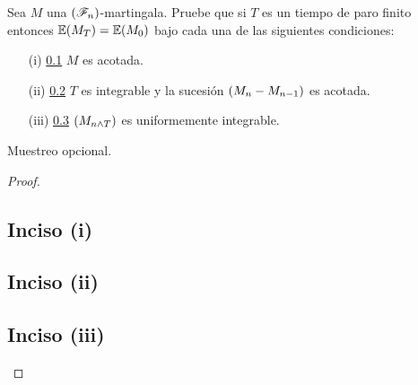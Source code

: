 \begin{problema}
Sea $M$ una $\left( \mathscr{F}_n\right) $-martingala. Pruebe que si $T$ es un tiempo de paro finito entonces $\mathbb{E}\! \left( M_T \right)=\mathbb{E}\! \left( M_0 \right)$ bajo cada una de las siguientes condiciones:
\begin{enumerate}
    \item[(i)] \ref{problema3_1:inciso1}
        $M$ es acotada.
    \item[(ii)] \ref{problema3_1:inciso2}
        $T$ es integrable y la sucesi\'on $\left( M_n-M_{n-1}\right) $ es acotada.
    \item[(iii)] \ref{problema3_1:inciso3}
        $\left( M_{n\wedge T}\right) $ es uniformemente integrable. 
\end{enumerate}

 Muestreo opcional.
\end{problema}

\begin{proof}
    \subsection{Inciso (i)}     \label{problema3_1:inciso1}
    
    \newpage
    
    \subsection{Inciso (ii)}    \label{problema3_1:inciso2}
    
    \newpage
        
    \subsection{Inciso (iii)}    \label{problema3_1:inciso3}
    
    \newpage
\end{proof}
